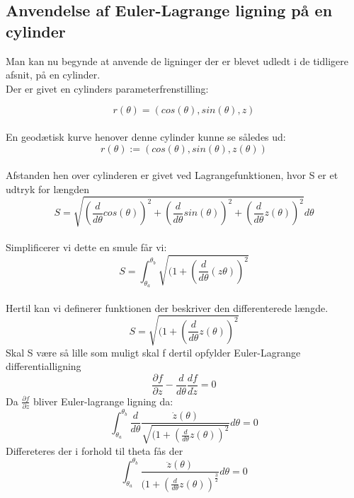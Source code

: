 \subsection{Anvendelse af Euler-Lagrange ligning på en cylinder}
Man kan nu begynde at anvende de ligninger der er blevet udledt i de tidligere afsnit, på en cylinder.
\\
Der er givet en cylinders parameterfrenstilling:

\begin{equation}
r(\theta)=(cos(\theta),sin(\theta),z)
\end{equation}
\\
En geodætisk kurve henover denne cylinder kunne se således ud:
\\
\begin{equation}
r(\theta):=(cos(\theta),sin(\theta),z(\theta))
\end{equation}
\\
Afstanden hen over cylinderen er givet ved Lagrangefunktionen, hvor S er et udtryk for længden
\begin{equation}
S = \sqrt{(\frac{d}{d\theta}cos(\theta))^2+(\frac{d}{d\theta}sin(\theta))^2+(\frac{d}{d\theta}z(\theta))^2}d\theta
\end{equation}
\\
Simplificerer vi dette en smule får vi:
\begin{equation*}
S=\int_{\theta_a}^{\theta_b}\sqrt{(1+(\frac{d}{d\theta}(z\theta))^2}
\end{equation*}
\\
Hertil kan vi definerer funktionen der beskriver den differenterede længde.
\begin{equation*}
S=\sqrt{(1+(\frac{d}{d\theta}z(\theta))^2}
\end{equation*}
Skal S være så lille som muligt skal f dertil opfylder Euler-Lagrange differentialligning
\begin{equation}
\frac{\partial f}{\partial z}-\frac{d}{d \theta} \frac{d f}{d\dot{z}}=0
\end{equation}
Da $\frac{\partial f}{\partial z}$ bliver Euler-lagrange ligning da:
\begin{equation}
\int_{\theta_a}^{\theta_b}\frac{d}{d\theta}\frac{\dot{z}(\theta)}{\sqrt{(1+(\frac{d}{d\theta}z(\theta))^2}}d\theta = 0
\end{equation}
Differeteres der i forhold til theta fås der
\begin{equation}
\int_{\theta_a}^{\theta_b}\frac{\ddot{z} (\theta)}{(1+(\frac{d}{d\theta}z(\theta))^\frac{3}{2}}d\theta = 0
\end{equation}
